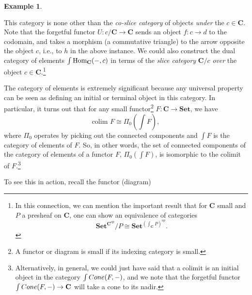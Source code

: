 \documentclass[11pt]{book}
\theoremstyle{definition}
\newtheorem{example}{Example}[section]
\theoremstyle{definition}
\theoremstyle{definition}
\theoremstyle{theorem}
\theoremstyle{definition}
\begin{document}
\begin{example}
	\begin{center}  
	\end{center} 
	This category is none other than the \textit{co-slice category} of objects \textit{under} the $c \in \textbf{C}$. Note that the forgetful functor $U: c/\textbf{C} \rightarrow \textbf{C}$ sends an object $f: c \rightarrow d$ to the codomain, and takes a morphism (a commutative triangle) to the arrow opposite the object $c$, i.e., to $h$ in the above instance. We could also construct the dual category of elements $\int \text{Hom}_{\textbf{C}}(\--, c)$ in terms of the \textit{slice category} $\textbf{C}/c$ \textit{over} the object $c \in \textbf{C}$.\footnote{In this connection, we can mention the important result that for $\textbf{C}$ small and $P$ a presheaf on \textbf{C}, one can show an equivalence of categories 
		\begin{equation*}
		\textbf{Set}^{\textbf{C}^{op}}/P \cong \textbf{Set}^{(\int_{\textbf{C}} P)^{op}} . 
		\end{equation*} } \par 
	The category of elements is extremely significant because any universal property can be seen as defining an initial or terminal object in this category. In particular, it turns out that for any small functor\footnote{A functor or diagram is small if its indexing category is small. } $F: \textbf{C} \rightarrow \textbf{Set}$, we have 
	\begin{equation}
	\text{colim } F \cong \Pi_0 (\int F),
	\end{equation}
	where $\Pi_0$ operates by picking out the connected components and $\int F$ is the category of elements of $F$. So, in other words, the set of connected components of the category of elements of a functor $F$, $\Pi_0 (\int F)$, is isomorphic to the colimit of $F$.\footnote{Alternatively, in general, we could just have said that a colimit is an initial object in the category $\int Cone(F, \--)$, and we note that the forgetful functor $\int Cone(F, \--) \rightarrow \textbf{C}$ will take a cone to its nadir.} \par 
	To see this in action, recall the functor (diagram) 
	\begin{center} 

\end{center}
\end{example}
\end{document}

